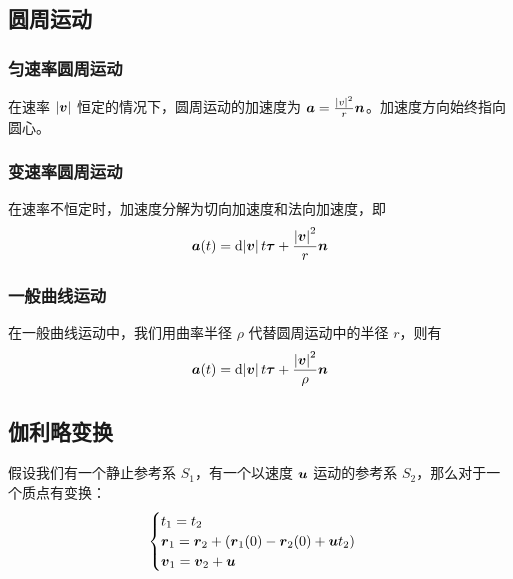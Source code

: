 \subsection{圆周运动}

\subsubsection{匀速率圆周运动}

在速率 $\abs{\boldsymbol{v}}$ 恒定的情况下，圆周运动的加速度为 $\boldsymbol{a} = \frac{\abs{v}^2}{r} \boldsymbol{n}$。加速度方向始终指向圆心。

\subsubsection{变速率圆周运动}

在速率不恒定时，加速度分解为切向加速度和法向加速度，即
$$
\boldsymbol{a}(t) = \dd{\abs{\boldsymbol{v}}}{t} \boldsymbol{\tau} + \frac{\abs{\boldsymbol{v}}^2}{r} \boldsymbol{n}
$$

\subsubsection{一般曲线运动}

在一般曲线运动中，我们用曲率半径 $\rho$ 代替圆周运动中的半径 $r$，则有
$$
\boldsymbol{a}(t) = \dd{\abs{\boldsymbol{v}}}{t} \boldsymbol{\tau} + \frac{\abs{\boldsymbol{v}}^2}{\rho} \boldsymbol{n}
$$

\subsection{伽利略变换}

假设我们有一个静止参考系 $S_1$，有一个以速度 $\boldsymbol{u}$ 运动的参考系 $S_2$，那么对于一个质点有变换：
$$
\begin{cases}
    t_1 = t_2 \\
    \boldsymbol{r}_1 = \boldsymbol{r}_2 + (\boldsymbol{r}_1(0) - \boldsymbol{r}_2(0) + \boldsymbol{u} t_2) \\ 
    \boldsymbol{v}_1 = \boldsymbol{v}_2 + \boldsymbol{u} \\
\end{cases}
$$
